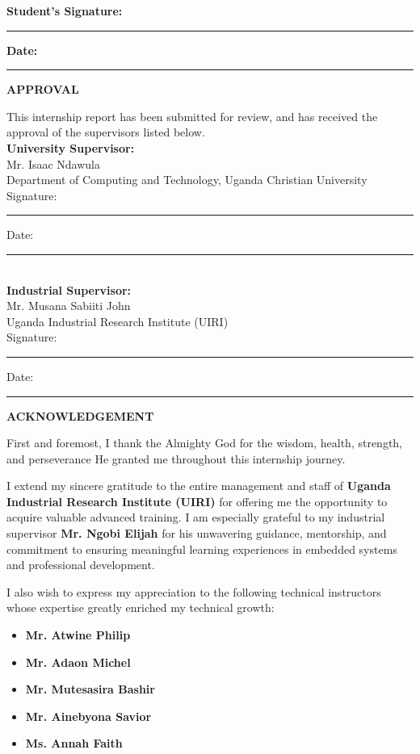 \documentclass[12pt,a4paper]{report}
\begin{document}
\vspace{2cm}
\noindent \textbf{Student's Signature:} \rule{6cm}{0.2pt} \hfill \textbf{Date:} \rule{3cm}{0.2pt}

\newpage
{\fontsize{14}{16.8}\selectfont\bfseries\centering APPROVAL\par}
\vspace{10pt}
\noindent This internship report has been submitted for review, and has received the approval of the supervisors listed below.\\[1cm]

\noindent \textbf{University Supervisor:} \\
Mr. Isaac Ndawula       \\
Department of Computing and Technology, Uganda Christian University\\[0.5cm]
Signature: \rule{5cm}{0.2pt} \hfill Date: \rule{3cm}{0.2pt}\\[1cm]

\noindent \textbf{Industrial Supervisor:} \\
Mr. Musana Sabiiti John\\
Uganda Industrial Research Institute (UIRI)\\[0.5cm]
Signature: \rule{5cm}{0.2pt} \hfill Date: \rule{3cm}{0.2pt}

\newpage
{\fontsize{14}{16.8}\selectfont\bfseries\centering ACKNOWLEDGEMENT\par}
\vspace{10pt}
\noindent First and foremost, I thank the Almighty God for the wisdom, health, strength, and perseverance He granted me throughout this internship journey.

\noindent I extend my sincere gratitude to the entire management and staff of \textbf{Uganda Industrial Research Institute (UIRI)} for offering me the opportunity to acquire valuable advanced training. I am especially grateful to my industrial supervisor \textbf{Mr. Ngobi Elijah} for his unwavering guidance, mentorship, and commitment to ensuring meaningful learning experiences in embedded systems and professional development.

\noindent I also wish to express my appreciation to the following technical instructors whose expertise greatly enriched my technical growth:
\begin{itemize}
    \item \textbf{Mr. Atwine Philip}
    \item \textbf{Mr. Adaon Michel}
    \item \textbf{Mr. Mutesasira Bashir}
    \item \textbf{Mr. Ainebyona Savior}
    \item \textbf{Ms. Annah Faith}
\end{itemize}
\end{document}
